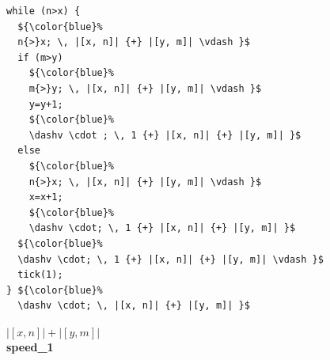 \documentclass[nocopyrightspace,preprint,pldi]{sigplanconf-pldi15}
\begin{document}
\begin{figure}
 \setlength{\progwidth}{.22\linewidth}
  \centering
\vspace{-.3cm}
\hspace{-0.4cm}
  \begin{minipage}[b]{.18\linewidth}
    \begin{center}
   \begin{lstlisting}[]
while (n>x) {
  ${\color{blue}%
  n{>}x; \, |[x, n]| {+} |[y, m]| \vdash }$
  if (m>y)
    ${\color{blue}%
    m{>}y; \, |[x, n]| {+} |[y, m]| \vdash }$
    y=y+1;
    ${\color{blue}%
    \dashv \cdot ; \, 1 {+} |[x, n]| {+} |[y, m]| }$
  else
    ${\color{blue}%
    n{>}x; \, |[x, n]| {+} |[y, m]| \vdash }$
    x=x+1;
    ${\color{blue}%
    \dashv \cdot; \, 1 {+} |[x, n]| {+} |[y, m]| }$
  ${\color{blue}%
  \dashv \cdot; \, 1 {+} |[x, n]| {+} |[y, m]| \vdash }$
  tick(1);
} ${\color{blue}%
  \dashv \cdot; \, |[x, n]| {+} |[y, m]| }$
   \end{lstlisting}
\vspace{-2.5ex}
$|[x, n]| + |[y, m]|$
\\[.4\baselineskip]
      {\bf speed\_1}
    \end{center}
  \end{minipage}
%
\hfill
%
  \begin{minipage}[b]{\progwidth}
    \begin{center}
   \begin{lstlisting}


\end{lstlisting}
\end{center}
\end{minipage}
\end{figure}
\end{document}
